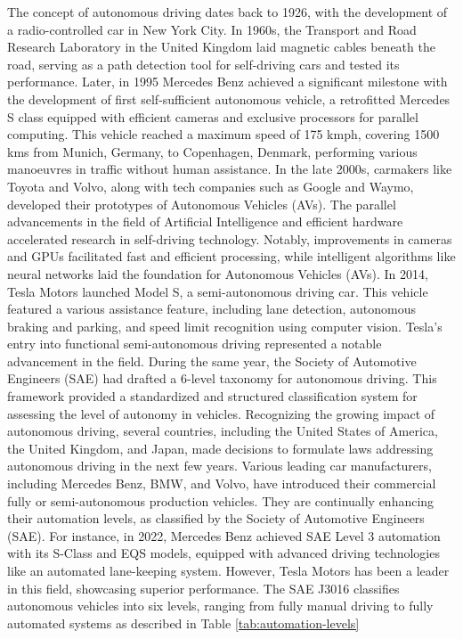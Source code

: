 \documentclass[12pt,twoside,a4paper,parskip]{scrbook} %
\begin{document}
The concept of autonomous driving dates back to 1926, with the development of a radio-controlled car in New York City. In 1960s, the Transport and Road Research Laboratory in the United Kingdom laid magnetic cables beneath the road, serving as a path detection tool for self-driving cars and tested its performance. Later, in 1995 Mercedes Benz achieved a significant milestone with the development of first self-sufficient autonomous vehicle, a retrofitted Mercedes S class equipped with efficient cameras and exclusive processors for parallel computing. This vehicle reached a maximum speed of 175 kmph, covering 1500 kms from Munich, Germany, to Copenhagen, Denmark, performing various manoeuvres in traffic without human assistance. In the late 2000s, carmakers like Toyota and Volvo, along with tech companies such as Google and Waymo, developed their prototypes of Autonomous Vehicles (AVs). 
The parallel advancements in the field of Artificial Intelligence and efficient hardware accelerated research in self-driving technology. Notably, improvements in cameras and GPUs facilitated fast and efficient processing, while intelligent algorithms like neural networks laid the foundation for Autonomous Vehicles (AVs). In 2014, Tesla Motors launched Model S, a semi-autonomous driving car. This vehicle featured a various assistance feature, including lane detection, autonomous braking and parking, and speed limit recognition using computer vision. Tesla's entry into functional semi-autonomous driving represented a notable advancement in the field. During the same year, the Society of Automotive Engineers (SAE) had drafted a 6-level taxonomy for autonomous driving. This framework provided a standardized and structured classification system for assessing the level of autonomy in vehicles. Recognizing the growing impact of autonomous driving, several countries, including the United States of America, the United Kingdom, and Japan, made decisions to formulate laws addressing autonomous driving in the next few years. Various leading car manufacturers, including Mercedes Benz, BMW, and Volvo, have introduced their commercial fully or semi-autonomous production vehicles. They are continually enhancing their automation levels, as classified by the Society of Automotive Engineers (SAE). For instance, in 2022, Mercedes Benz achieved SAE Level 3 automation with its S-Class and EQS models, equipped with advanced driving technologies like an automated lane-keeping system. However, Tesla Motors has been a leader in this field, showcasing superior performance.
The SAE J3016 classifies autonomous vehicles into six levels, ranging from fully manual driving to fully automated systems as described in Table \ref{tab:automation-levels} \cite{sae2019}
\end{document}
